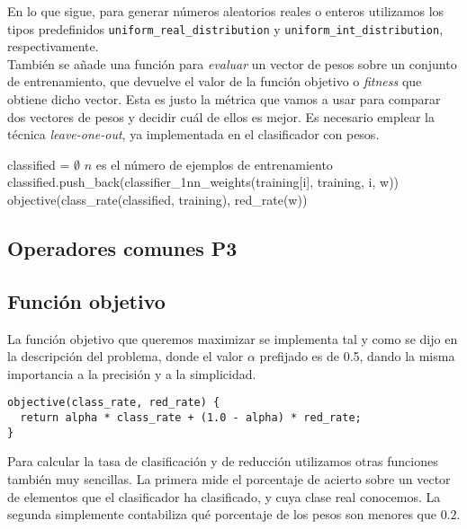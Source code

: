 \documentclass[12pt]{article}
\begin{document}
En lo que sigue, para generar números aleatorios reales o enteros utilizamos los tipos predefinidos \verb|uniform_real_distribution| y \verb|uniform_int_distribution|, respectivamente.\\

También se añade una función para \textit{evaluar} un vector de pesos sobre un conjunto de entrenamiento, que devuelve el valor de la función objetivo o \textit{fitness} que obtiene dicho vector. Esta es justo la métrica que vamos a usar para comparar dos vectores de pesos y decidir cuál de ellos es mejor. Es necesario emplear la técnica \textit{leave-one-out}, ya implementada en el clasificador con pesos.

\begin{algorithm}[ht]
\begin{algorithmic}

    \State classified = $\emptyset$
      \Comment $n$ es el número de ejemplos de entrenamiento
        \State classified.push\_back(classifier\_1nn\_weights(training[i], training, i, w))
    \EndFor
\State \Return objective(class\_rate(classified, training), red\_rate(w))
\EndFunction

\end{algorithmic}
\end{algorithm}

\subsection*{Operadores comunes P3}
\label{op_comunes}

\subsection*{{\color{red}Función objetivo}}

La función objetivo que queremos maximizar se implementa tal y como se dijo en la descripción del problema, donde el valor $\alpha$ prefijado es de 0.5, dando la misma importancia a la precisión y a la simplicidad.

\begin{verbatim}
objective(class_rate, red_rate) {
  return alpha * class_rate + (1.0 - alpha) * red_rate;
}
\end{verbatim}

Para calcular la tasa de clasificación y de reducción utilizamos otras funciones también muy sencillas. La primera mide el porcentaje de acierto sobre un vector de elementos que el clasificador ha clasificado, y cuya clase real conocemos. La segunda simplemente contabiliza qué porcentaje de los pesos son menores que $0.2$.
\end{document}
